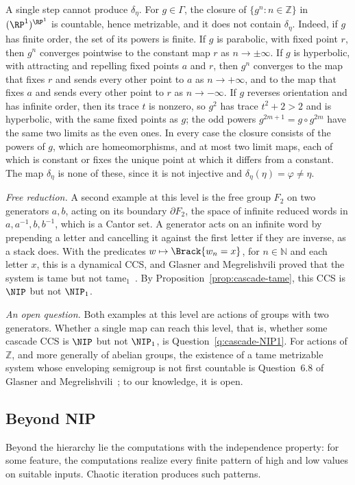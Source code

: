 A single step cannot produce $\delta_\eta$.
For $g\in\Gamma$, the closure of $\{g^n:n\in\mathbb{Z}\}$ in $(\RP^1)^{\RP^1}$ is
countable, hence metrizable, and it does not contain $\delta_\eta$.
Indeed, if $g$ has finite order, the set of its powers is finite.
If $g$ is parabolic, with fixed point $r$, then $g^n$ converges pointwise to the
constant map $r$ as $n\to\pm\infty$.
If $g$ is hyperbolic, with attracting and repelling fixed points $a$ and $r$,
then $g^n$ converges to the map that fixes $r$ and sends every other point to
$a$ as $n\to+\infty$, and to the map that fixes $a$ and sends every other point
to $r$ as $n\to-\infty$.
If $g$ reverses orientation and has infinite order, then its trace $t$ is
nonzero, so $g^2$ has trace $t^2+2>2$ and is hyperbolic, with the same fixed
points as $g$; the odd powers $g^{2m+1}=g\circ g^{2m}$ have the same two limits
as the even ones.
In every case the closure consists of the powers of $g$, which are
homeomorphisms, and at most two limit maps, each of which is constant or
fixes the unique point at which it differs from a constant.
The map $\delta_\eta$ is none of these, since it is not injective and
$\delta_\eta(\eta)=\varphi\ne\eta$.

\emph{Free reduction.}
A second example at this level is the free group $F_2$ on two generators $a,b$,
acting on its boundary $\partial F_2$, the space of infinite reduced words in
$a,a^{-1},b,b^{-1}$, which is a Cantor set.
A generator acts on an infinite word by prepending a letter and cancelling it
against the first letter if they are inverse, as a stack does.
With the predicates $w\mapsto\Brack{w_n=x}$, for $n\in\mathbb{N}$ and each letter $x$, this is a dynamical CCS, and
Glasner and Megrelishvili proved that the system is tame but not
tame$_1$~\cite[Corollary~6.6 and Example~6.7]{glasner2022tame}.
By Proposition~\ref{prop:cascade-tame}, this CCS is $\NIP$ but not $\NIP_1$.

\emph{An open question.}
Both examples at this level are actions of groups with two generators.
Whether a single map can reach this level, that is, whether some cascade CCS
is $\NIP$ but not $\NIP_1$, is Question~\ref{q:cascade-NIP1}.
For actions of $\mathbb{Z}$, and more generally of abelian groups, the
existence of a tame metrizable system whose enveloping semigroup is not first
countable is Question~6.8 of Glasner and Megrelishvili~\cite{glasner2022tame};
to our knowledge, it is open.


\subsection{Beyond NIP}
\label{sec:beyond-NIP}
Beyond the hierarchy lie the computations with the independence property:
for some feature, the computations realize every finite pattern of high and
low values on suitable inputs.
Chaotic iteration produces such patterns.


